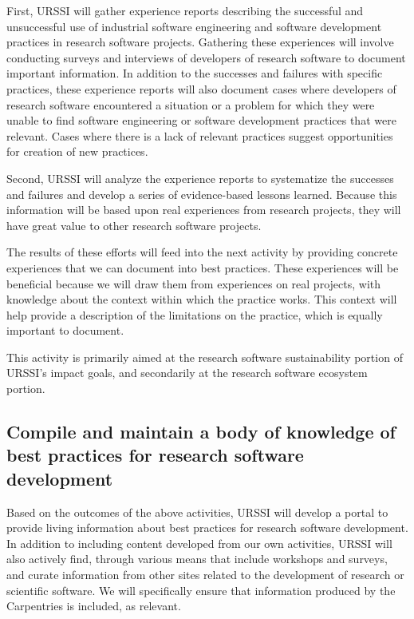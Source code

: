 \documentclass[
]{book}
\begin{document}
First, URSSI will gather experience reports describing the successful and unsuccessful use
of industrial software engineering and software development practices in research software
projects. Gathering these experiences will involve conducting surveys and interviews of
developers of research software to document important information. In addition to the
successes and failures with specific practices, these experience reports will also document
cases where developers of research software encountered a situation or a problem for which
they were unable to find software engineering or software development practices that were
relevant. Cases where there is a lack of relevant practices suggest opportunities for
creation of new practices.

Second, URSSI will analyze the experience reports to systematize the successes and failures
and develop a series of evidence-based lessons learned. Because this information will be
based upon real experiences from research projects, they will have great value to other
research software projects.

The results of these efforts will feed into the next activity by providing concrete experiences
that we can document into best practices. These experiences will be beneficial because we
will draw them from experiences on real projects, with knowledge about the context within
which the practice works. This context will help provide a description of the limitations
on the practice, which is equally important to document.

This activity is primarily aimed at the research software sustainability portion of URSSI's impact goals, and secondarily at the research software ecosystem portion.

\hypertarget{compile-and-maintain-a-body-of-knowledge-of-best-practices-for-research-software-development}{%
\subsection{Compile and maintain a body of knowledge of best practices for research software development}\label{compile-and-maintain-a-body-of-knowledge-of-best-practices-for-research-software-development}}

Based on the outcomes of the above activities, URSSI will develop a portal to provide living
information about best practices for research software development. In addition to including
content developed from our own activities, URSSI will also actively find, through various
means that include workshops and surveys, and curate information from other sites related
to the development of research or scientific software. We will specifically ensure that
information produced by the Carpentries is included, as relevant.
\end{document}
